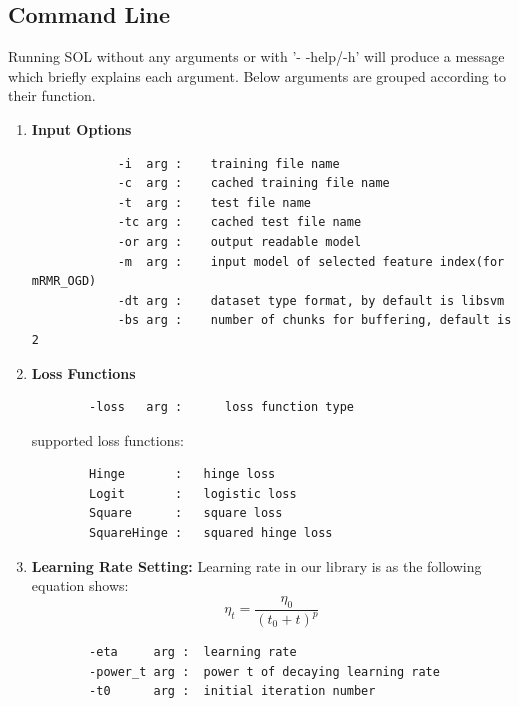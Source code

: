 \documentclass[11pt,a4paper]{article}
\newlength{\wideitemsep}
\let\olditem\item
\renewcommand{\item}{\setlength{\itemsep}{\wideitemsep}\olditem}
\begin{document}
\subsection{Command Line}
Running SOL without any arguments or with '- -help/-h' will produce a message which briefly explains each argument. Below arguments are grouped according to their function.

\begin{enumerate}
    \item \textbf{Input Options}
        \begin{lstlisting}
            -i  arg :    training file name
            -c  arg :    cached training file name
            -t  arg :    test file name
            -tc arg :    cached test file name
            -or arg :    output readable model
            -m  arg :    input model of selected feature index(for mRMR_OGD)
            -dt arg :    dataset type format, by default is libsvm 
            -bs arg :    number of chunks for buffering, default is 2
        \end{lstlisting}

    \item \textbf{Loss Functions}
        \begin{lstlisting}
        -loss   arg :      loss function type
        \end{lstlisting}

        supported loss functions: 
        \begin{lstlisting}
        Hinge       :   hinge loss
        Logit       :   logistic loss
        Square      :   square loss
        SquareHinge :   squared hinge loss
        \end{lstlisting}

    \item \textbf{Learning Rate Setting:} Learning rate in our library is as the following equation shows:
        \begin{equation}
            \eta_t=\frac{\eta_0}{(t_0+t)^p}
            \label{equ:lrate}
        \end{equation}

        
        \begin{lstlisting}
        -eta     arg :  learning rate
        -power_t arg :  power t of decaying learning rate
        -t0      arg :  initial iteration number
        \end{lstlisting}


\end{enumerate}
\end{document}
